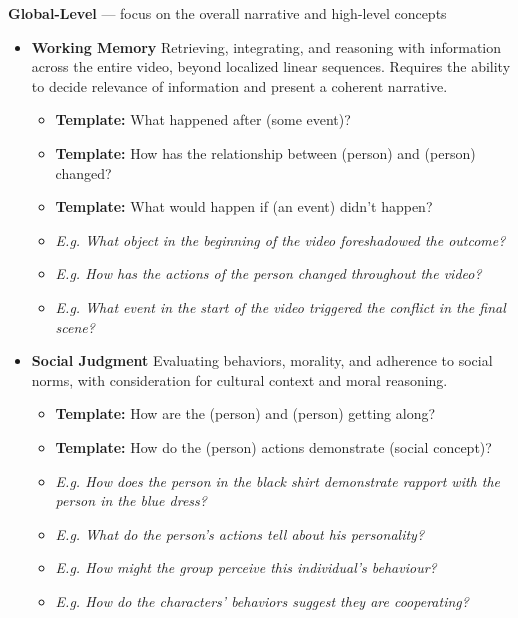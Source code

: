 \begin{tcolorbox}[colframe=black, colback=white, arc=3mm, boxrule=1pt, width=\linewidth, title=\textbf{Annotation Instructions}, breakable]
\textbf{Global-Level} — focus on the overall narrative and high-level concepts
    \begin{itemize}
        \item \textbf{Working Memory} Retrieving, integrating, and reasoning with information across the entire video, beyond localized linear sequences. Requires the ability to decide relevance of information and present a coherent narrative.
        \begin{itemize}
            \item \textbf{Template:} What happened after (some event)? 
            \item \textbf{Template:} How has the relationship between (person) and (person) changed?
            \item \textbf{Template:} What would happen if (an event) didn’t happen? 
            \item \textit{E.g. What object in the beginning of the video foreshadowed the outcome?}
            \item \textit{E.g. How has the actions of the person changed throughout the video?}
            \item \textit{E.g. What event in the start of the video triggered the conflict in the final scene?}
        \end{itemize}
        \item \textbf{Social Judgment} Evaluating behaviors, morality, and adherence to social norms, with consideration for cultural context and moral reasoning.
        \begin{itemize}
            \item \textbf{Template:} How are the (person) and (person) getting along?
            \item \textbf{Template:} How do the (person) actions demonstrate (social concept)?
            \item \textit{E.g. How does the person in the black shirt demonstrate rapport with the person in the blue dress?}
            \item \textit{E.g. What do the person’s actions tell about his personality?}
            \item \textit{E.g. How might the group perceive this individual’s behaviour?}
            \item \textit{E.g. How do the characters’ behaviors suggest they are cooperating?}
        \end{itemize}


\end{itemize}
\end{tcolorbox}
